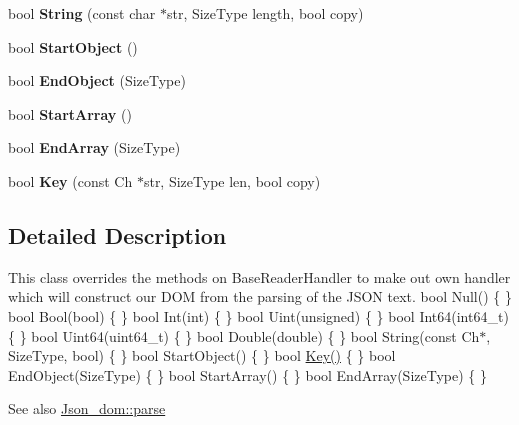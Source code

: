 \begin{DoxyCompactItemize}
\item 
\mbox{\label{classRapid__json__handler_a272fbb43cf9be77b869dbf8e20ec326a}} 
bool {\bfseries String} (const char $\ast$str, Size\+Type length, bool copy)
\item 
\mbox{\label{classRapid__json__handler_adf71fe29689c58851a35e56b7990c383}} 
bool {\bfseries Start\+Object} ()
\item 
\mbox{\label{classRapid__json__handler_a7c2ab0848c2b78b1f619f6a5ed1a6ef0}} 
bool {\bfseries End\+Object} (Size\+Type)
\item 
\mbox{\label{classRapid__json__handler_a10590c0909d752acc7dc551871183641}} 
bool {\bfseries Start\+Array} ()
\item 
\mbox{\label{classRapid__json__handler_ab2c907f8247c55664ec70e3385c127da}} 
bool {\bfseries End\+Array} (Size\+Type)
\item 
\mbox{\label{classRapid__json__handler_a46fc455783b061e5282c142c3ae5f200}} 
bool {\bfseries Key} (const Ch $\ast$str, Size\+Type len, bool copy)
\end{DoxyCompactItemize}


\subsection{Detailed Description}
This class overrides the methods on Base\+Reader\+Handler to make out own handler which will construct our D\+OM from the parsing of the J\+S\+ON text. {\ttfamily  bool Null() \{ \} bool Bool(bool) \{ \} bool Int(int) \{ \} bool Uint(unsigned) \{ \} bool Int64(int64\+\_\+t) \{ \} bool Uint64(uint64\+\_\+t) \{ \} bool Double(double) \{ \} bool String(const Ch$\ast$, Size\+Type, bool) \{ \} bool Start\+Object() \{ \} bool \mbox{\hyperlink{classKey}{Key()}} \{ \} bool End\+Object(\+Size\+Type) \{ \} bool Start\+Array() \{ \} bool End\+Array(\+Size\+Type) \{ \} } \begin{DoxySeeAlso}{See also}
\mbox{\hyperlink{classJson__dom_a9615aa0ae1427d5f5986a2d85d506716}{Json\+\_\+dom\+::parse}} 
\end{DoxySeeAlso}


